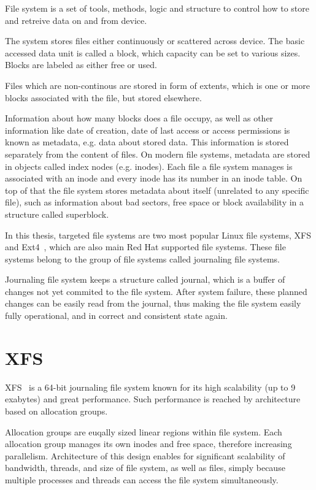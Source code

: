 \documentclass[
  color, %
  table, %
  lof,   %
  lot,   %
]{fithesis3}
\begin{document}
File system is a set of tools, methods, logic and structure to control how to store and retreive data on and from device.

The system stores files either continuously or scattered across device. The basic accessed data unit is called a block, which capacity can be set to various sizes. Blocks are labeled as either free or used.

Files which are non-continous are stored in form of extents, which is one or more blocks associated with the file, but stored elsewhere.  

Information about how many blocks does a file occupy, as well as other information like date of creation, date of last access or access permissions is known as metadata, e.g. data about stored data. This information is stored separately from the content of files. On modern file systems, metadata are stored in objects called index nodes (e.g. inodes). Each file a file system manages is associated with an inode and every inode has its number in an inode table. On top of that the file system stores metadata about itself (unrelated to any specific file), such as information about bad sectors, free space or block availability in a structure called superblock.

In this thesis, targeted file systems are two most popular Linux file systems, XFS and Ext4~\cite{Lu:2014:SLF:2578042.2560012}, which are also main Red Hat supported file systems. These file systems belong to the group of file systems called journaling file systems.

Journaling file system keeps a structure called journal, which is a buffer of changes not yet commited to the file system. After system failure, these planned changes can be easily read from the journal, thus making the file system easily fully operational, and in correct and consistent state again.

\section{XFS}
XFS~\cite{xfs:page} is a 64-bit journaling file system known for its high scalability (up to 9 exabytes) and great performance. Such performance is reached by architecture based on allocation groups.

Allocation groups are euqally sized linear regions within file system. Each allocation group manages its own inodes and free space, therefore increasing parallelism. Architecture of this design enables for significant scalability of bandwidth, threads, and size of file system, as well as files, simply because multiple processes and threads can access the file system simultaneously.
\end{document}

